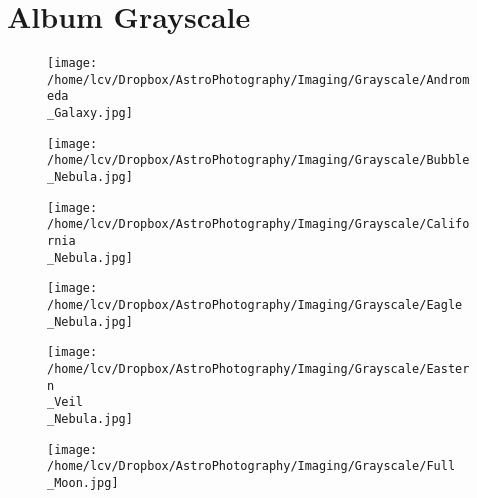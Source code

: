 \section{Album Grayscale}
\begin{figure}[phbt]
	\texttt{[image: /home/lcv/Dropbox/AstroPhotography/Imaging/Grayscale/Andromeda\\\_Galaxy.jpg]}


\end{figure}
\newpage
\begin{figure}[phbt]
	\texttt{[image: /home/lcv/Dropbox/AstroPhotography/Imaging/Grayscale/Bubble\\\_Nebula.jpg]}


\end{figure}
\newpage
\begin{figure}[phbt]
	\texttt{[image: /home/lcv/Dropbox/AstroPhotography/Imaging/Grayscale/California\\\_Nebula.jpg]}


\end{figure}
\newpage
\begin{figure}[phbt]
	\texttt{[image: /home/lcv/Dropbox/AstroPhotography/Imaging/Grayscale/Eagle\\\_Nebula.jpg]}


\end{figure}
\newpage
\begin{figure}[phbt]
	\texttt{[image: /home/lcv/Dropbox/AstroPhotography/Imaging/Grayscale/Eastern\\\_Veil\\\_Nebula.jpg]}


\end{figure}
\newpage
\begin{figure}[phbt]
	\texttt{[image: /home/lcv/Dropbox/AstroPhotography/Imaging/Grayscale/Full\\\_Moon.jpg]}


\end{figure}
